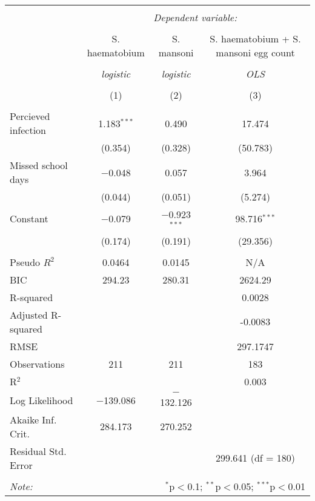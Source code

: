 
\begin{table}[!htbp] \centering 
  \caption{} 
  \label{} 
\begin{tabular}{@{\extracolsep{3pt}}lccc} 
\\[-1.8ex]\hline 
\hline \\[-1.8ex] 
 & \multicolumn{3}{c}{\textit{Dependent variable:}} \\ 
\cline{2-4} 
\\[-1.8ex] & S. haematobium & S. mansoni & S. haematobium + S. mansoni egg count \\ 
\\[-1.8ex] & \textit{logistic} & \textit{logistic} & \textit{OLS} \\ 
\\[-1.8ex] & (1) & (2) & (3)\\ 
\hline \\[-1.8ex] 
 Percieved infection & 1.183$^{***}$ & 0.490 & 17.474 \\ 
  & (0.354) & (0.328) & (50.783) \\ 
  Missed school days & $-$0.048 & 0.057 & 3.964 \\ 
  & (0.044) & (0.051) & (5.274) \\ 
  Constant & $-$0.079 & $-$0.923$^{***}$ & 98.716$^{***}$ \\ 
  & (0.174) & (0.191) & (29.356) \\ 
 \hline \\[-1.8ex] 
Pseudo $R^2$ & 0.0464 & 0.0145 & N/A \\ 
BIC & 294.23 & 280.31 & 2624.29 \\ 
R-squared &  &  & 0.0028 \\ 
Adjusted R-squared &  &  & -0.0083 \\ 
RMSE &  &  & 297.1747 \\ 
Observations & 211 & 211 & 183 \\ 
R$^{2}$ &  &  & 0.003 \\ 
Log Likelihood & $-$139.086 & $-$132.126 &  \\ 
Akaike Inf. Crit. & 284.173 & 270.252 &  \\ 
Residual Std. Error &  &  & 299.641 (df = 180) \\ 
\hline 
\hline \\[-1.8ex] 
\textit{Note:}  & \multicolumn{3}{r}{$^{*}$p$<$0.1; $^{**}$p$<$0.05; $^{***}$p$<$0.01} \\ 
\end{tabular} 
\end{table} 
